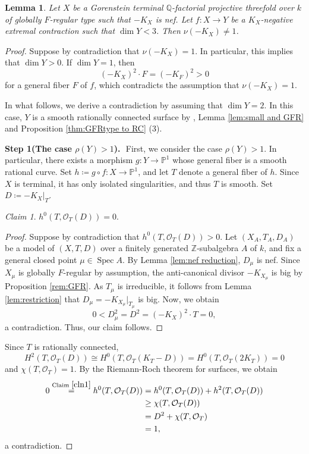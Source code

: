 \documentclass[12pt]{amsart}
\def\Spec{\operatorname{Spec}}
\newcommand{\Q}{\mathbb{Q}}
\newcommand{\Z}{\mathbb{Z}}
\newcommand{\PP}{\mathbb{P}}
\newcommand{\sO}{\mathcal{O}}
\theoremstyle{plain}
\newtheorem{lem}[thm]{Lemma}
\theoremstyle{definition}
\theoremstyle{remark}
\newtheorem{defn and notation}[thm]{Definition and Notation}
\newtheorem{cln}{Claim}
\theoremstyle{plain}
\begin{document}
\begin{lem}\label{lem:nu=1,non-birat}
    Let $X$ be a Gorenstein terminal $\Q$-factorial projective threefold over $k$ of globally $F$-regular type such that $-K_X$ is nef. 
    Let $f\colon X\to Y$ be a $K_X$-negative extremal  contraction such that
 $\dim Y<3$. Then $\nu(-K_X)\neq 1$.
\end{lem}
    \begin{proof}
    Suppose by contradiction that $\nu(-K_X)=1$. In particular, this implies that $\dim Y>0$.
     If $\dim Y=1$, then  \[(-K_X)^2\cdot F=(-K_F)^2>0\] for a general fiber $F$ of $f$, which contradicts the assumption that $\nu(-K_X)=1$.
     
    In what follows, we derive a contradiction by assuming that $\dim Y=2$.
    In this case, $Y$ is a smooth rationally connected surface by \cite[Theorem 7]{Cutkosky88}, Lemma \ref{lem:small and GFR} and Proposition \ref{thm:GFRtype to RC} (3).

    
    \textbf{Step 1(The case $\rho(Y)>1$).}\,\,
    First, we consider the case $\rho(Y)>1$.
    In particular, there exists a morphism $g\colon Y\to \PP^1$ whose general fiber is a smooth rational curve.
    Set $h\coloneqq g\circ f\colon X\to \PP^1$, and let $T$ denote a general fiber of $h$.
    Since $X$ is terminal, it has only isolated singularities, and thus $T$ is smooth.
    Set $D\coloneqq -K_X|_T$.
    \begin{cln}\label{cln1}
        $h^0(T,\sO_T(D))=0$.
    \end{cln}
    \begin{proof}
        Suppose by contradiction that $h^0(T,\sO_T(D))>0$.
        Let $(X_A, T_A, D_A)$ be a model of $(X, T, D)$ over a finitely generated $\Z$-subalgebra $A$ of $k$, and fix a general closed point $\mu \in \Spec A$. 
        By Lemma \ref{lem:nef reduction}, $D_{\mu}$ is nef.
    Since $X_{\mu}$ is globally $F$-regular by assumption, the anti-canonical divisor $-K_{X_{\mu}}$ is big by Proposition \ref{rem:GFR}.
    As $T_{\mu}$ is irreducible, it follows from Lemma \ref{lem:restriction} that $D_{\mu}=-K_{X_{\mu}}|_{T_{\mu}}$ is big.
    Now, we obtain
    \[
    0<D_{\mu}^2= D^2=(-K_X)^2\cdot T=0,
    \]
    a contradiction. Thus, our claim follows.
    \end{proof}
    
    
    Since $T$ is rationally connected,  
    \[H^2(T,\sO_T(D))\cong H^0(T,\sO_T(K_T-D))=H^0(T,\sO_T(2K_T))=0\] 
    and $\chi(T,\sO_T)=1$.
    By the Riemann-Roch theorem for surfaces, we obtain
    \begin{align*}
        0\overset{\text{Claim}\,\,\ref{cln1}}{=}h^0(T, \sO_T(D))&=h^0(T, \sO_T(D))+h^2(T, \sO_T(D))\\
    &\geq \chi(T,\sO_T(D))\\
    &=D^2+\chi(T,\sO_T)\\
    &= 1,
    \end{align*}
    a contradiction.
   

\end{proof}
\end{document}
